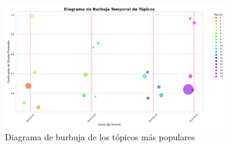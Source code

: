 \documentclass[10pt, a4paper]{article}
\begin{document}
	\begin{figure}[H]
		\centering
		\includegraphics[width=0.85\textwidth]{diagrama_burbuja.pdf}
		\caption{Diagrama de burbuja de los tópicos más populares}
		\label{fig:diagrama_burbuja}
	\end{figure}
	\vspace{-5mm}
\end{document}
